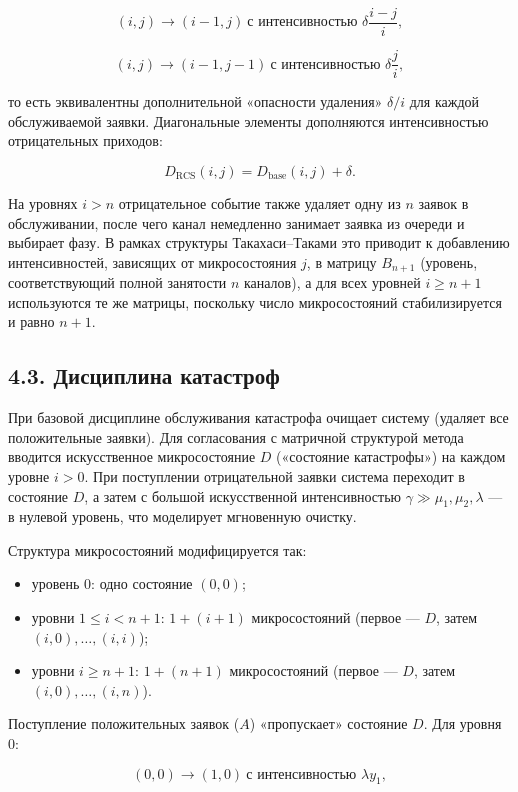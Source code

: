 \[(i,j)\to(i-1,j)\ \text{с интенсивностью }\delta\frac{i-j}{i},\]

\[(i,j)\to(i-1,j-1)\ \text{с интенсивностью }\delta\frac{j}{i},\]


то есть эквивалентны дополнительной «опасности удаления» \(\delta/i\) для каждой обслуживаемой заявки. Диагональные элементы дополняются интенсивностью отрицательных приходов:


\[D_{\text{RCS}}(i,j)=D_{\text{base}}(i,j)+\delta.\]



На уровнях \(i>n\) отрицательное событие также удаляет одну из \(n\) заявок в обслуживании, после чего канал немедленно занимает заявка из очереди и выбирает фазу. В рамках структуры Такахаси--Таками это приводит к добавлению интенсивностей, зависящих от микросостояния \(j\), в матрицу \(B_{n+1}\) (уровень, соответствующий полной занятости \(n\) каналов), а для всех уровней \(i\ge n+1\) используются те же матрицы, поскольку число микросостояний стабилизируется и равно \(n+1\).

\subsection*{4.3. Дисциплина катастроф}
При базовой дисциплине обслуживания катастрофа очищает систему (удаляет все положительные заявки). Для согласования с матричной структурой метода вводится искусственное микросостояние \(D\) («состояние катастрофы») на каждом уровне \(i>0\). При поступлении отрицательной заявки система переходит в состояние \(D\), а затем с большой искусственной интенсивностью \(\gamma\gg\mu_1,\mu_2,\lambda\) --- в нулевой уровень, что моделирует мгновенную очистку.

Структура микросостояний модифицируется так:
\begin{itemize}[leftmargin=1.2em]
  \item уровень \(0\): одно состояние \((0,0)\);
  \item уровни \(1\le i<n+1\): \(1+(i+1)\) микросостояний (первое --- \(D\), затем \((i,0),\dots,(i,i)\));
  \item уровни \(i\ge n+1\): \(1+(n+1)\) микросостояний (первое --- \(D\), затем \((i,0),\dots,(i,n)\)).
\end{itemize}

Поступление положительных заявок (\(A\)) «пропускает» состояние \(D\). Для уровня \(0\):


\[(0,0)\to(1,0)\ \text{с интенсивностью }\lambda y_1,\]

